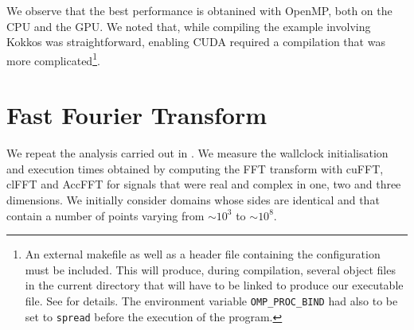 \documentclass[12pt, a4paper]{article}
\begin{document}
We observe that the best performance is obtanined with OpenMP, both on
the CPU and the GPU. We noted that, while compiling the example
involving Kokkos was straightforward, enabling CUDA required a
compilation that was more complicated\footnote{An external makefile as
  well as a header file containing the configuration must be
  included. This will produce, during compilation, several object
  files in the current directory that will have to be linked to
  produce our executable file. See \cite{KOKKOSDOC} for details. The
  environment variable \texttt{OMP\_PROC\_BIND} had also to be set to
  \texttt{spread} before the execution of the program.}.

\section{Fast Fourier Transform}\label{FFT}
We repeat the analysis carried out in \cite{FFTREPORT}. We measure the
wallclock initialisation and execution times obtained by computing the
FFT transform with cuFFT, clFFT and AccFFT for signals that were real
and complex in one, two and three dimensions. We initially consider
domains whose sides are identical and that contain a number of points
varying from $\sim 10^3$ to $\sim 10^8$.
\end{document}
